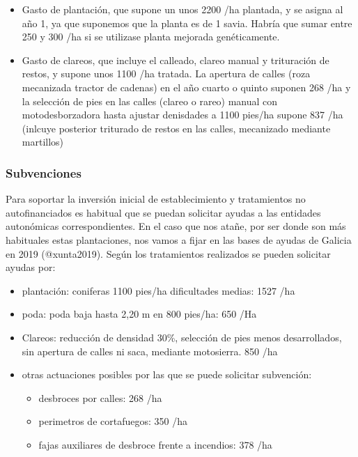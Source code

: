 \documentclass[
]{article}
\providecommand{\tightlist}{%
  \setlength{\itemsep}{0pt}\setlength{\parskip}{0pt}}
\begin{document}
\begin{itemize}
\item
  Gasto de plantación, que supone un unos 2200 /ha plantada, y se asigna
  al año 1, ya que suponemos que la planta es de 1 savia. Habría que
  sumar entre 250 y 300 /ha si se utilizase planta mejorada
  genéticamente.
\item
  Gasto de clareos, que incluye el calleado, clareo manual y trituración
  de restos, y supone unos 1100 /ha tratada. La apertura de calles (roza
  mecanizada tractor de cadenas) en el año cuarto o quinto suponen 268
  /ha y la selección de pies en las calles (clareo o rareo) manual con
  motodesborzadora hasta ajustar denisdades a 1100 pies/ha supone 837
  /ha (inlcuye posterior triturado de restos en las calles, mecanizado
  mediante martillos)
\end{itemize}

\hypertarget{subvenciones}{%
\subsubsection{Subvenciones}\label{subvenciones}}

Para soportar la inversión inicial de establecimiento y tratamientos no
autofinanciados es habitual que se puedan solicitar ayudas a las
entidades autonómicas correspondientes. En el caso que nos atañe, por
ser donde son más habituales estas plantaciones, nos vamos a fijar en
las bases de ayudas de Galicia en 2019 (@xunta2019). Según los
tratamientos realizados se pueden solicitar ayudas por:

\begin{itemize}
\tightlist
\item
  plantación: coniferas 1100 pies/ha dificultades medias: 1527 /ha
\item
  poda: poda baja hasta 2,20 m en 800 pies/ha: 650 /Ha
\item
  Clareos: reducción de densidad 30\%, selección de pies menos
  desarrollados, sin apertura de calles ni saca, mediante motosierra.
  850 /ha
\item
  otras actuaciones posibles por las que se puede solicitar subvención:

  \begin{itemize}
  \tightlist
  \item
    desbroces por calles: 268 /ha
  \item
    perimetros de cortafuegos: 350 /ha
  \item
    fajas auxiliares de desbroce frente a incendios: 378 /ha
  \end{itemize}
\end{itemize}
\end{document}
